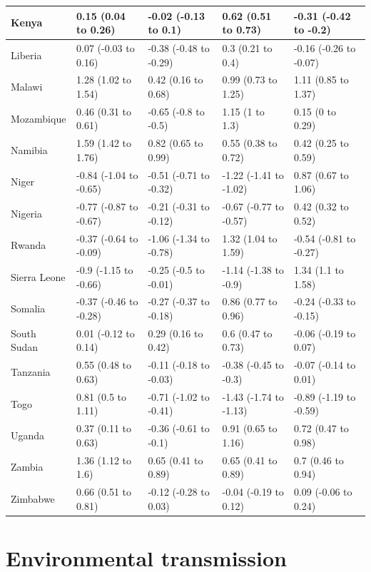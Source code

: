 \documentclass[
]{book}
\begin{document}
\begin{table}[!h]
\begin{tabular}[t]{l|l|l|l|l}
\hline
Kenya & 0.15 (0.04 to 0.26) & -0.02 (-0.13 to 0.1) & 0.62 (0.51 to 0.73) & -0.31 (-0.42 to -0.2)\\
\hline
Liberia & 0.07 (-0.03 to 0.16) & -0.38 (-0.48 to -0.29) & 0.3 (0.21 to 0.4) & -0.16 (-0.26 to -0.07)\\
\hline
Malawi & 1.28 (1.02 to 1.54) & 0.42 (0.16 to 0.68) & 0.99 (0.73 to 1.25) & 1.11 (0.85 to 1.37)\\
\hline
Mozambique & 0.46 (0.31 to 0.61) & -0.65 (-0.8 to -0.5) & 1.15 (1 to 1.3) & 0.15 (0 to 0.29)\\
\hline
Namibia & 1.59 (1.42 to 1.76) & 0.82 (0.65 to 0.99) & 0.55 (0.38 to 0.72) & 0.42 (0.25 to 0.59)\\
\hline
Niger & -0.84 (-1.04 to -0.65) & -0.51 (-0.71 to -0.32) & -1.22 (-1.41 to -1.02) & 0.87 (0.67 to 1.06)\\
\hline
Nigeria & -0.77 (-0.87 to -0.67) & -0.21 (-0.31 to -0.12) & -0.67 (-0.77 to -0.57) & 0.42 (0.32 to 0.52)\\
\hline
Rwanda & -0.37 (-0.64 to -0.09) & -1.06 (-1.34 to -0.78) & 1.32 (1.04 to 1.59) & -0.54 (-0.81 to -0.27)\\
\hline
Sierra Leone & -0.9 (-1.15 to -0.66) & -0.25 (-0.5 to -0.01) & -1.14 (-1.38 to -0.9) & 1.34 (1.1 to 1.58)\\
\hline
Somalia & -0.37 (-0.46 to -0.28) & -0.27 (-0.37 to -0.18) & 0.86 (0.77 to 0.96) & -0.24 (-0.33 to -0.15)\\
\hline
South Sudan & 0.01 (-0.12 to 0.14) & 0.29 (0.16 to 0.42) & 0.6 (0.47 to 0.73) & -0.06 (-0.19 to 0.07)\\
\hline
Tanzania & 0.55 (0.48 to 0.63) & -0.11 (-0.18 to -0.03) & -0.38 (-0.45 to -0.3) & -0.07 (-0.14 to 0.01)\\
\hline
Togo & 0.81 (0.5 to 1.11) & -0.71 (-1.02 to -0.41) & -1.43 (-1.74 to -1.13) & -0.89 (-1.19 to -0.59)\\
\hline
Uganda & 0.37 (0.11 to 0.63) & -0.36 (-0.61 to -0.1) & 0.91 (0.65 to 1.16) & 0.72 (0.47 to 0.98)\\
\hline
Zambia & 1.36 (1.12 to 1.6) & 0.65 (0.41 to 0.89) & 0.65 (0.41 to 0.89) & 0.7 (0.46 to 0.94)\\
\hline
Zimbabwe & 0.66 (0.51 to 0.81) & -0.12 (-0.28 to 0.03) & -0.04 (-0.19 to 0.12) & 0.09 (-0.06 to 0.24)\\
\hline
\end{tabular}
\end{table}

\section{Environmental transmission}\label{environmental-transmission}
\end{document}
